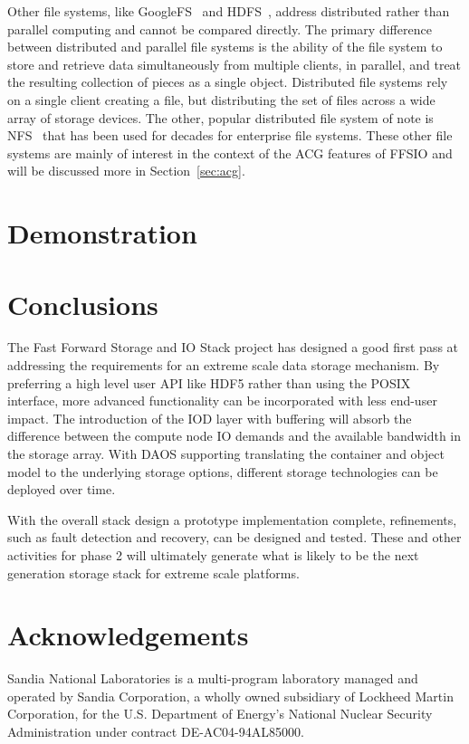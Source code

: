 \documentclass{sig-alt-gov2}
\begin{document}
Other file systems, like GoogleFS~\cite{ghemawat:googlefs} and
HDFS~\cite{Shvachko:2010:hdfs}, address distributed rather than parallel
computing and cannot be compared directly.
The primary difference between
distributed and parallel file systems is the ability of the file system to
store and retrieve data simultaneously from multiple clients, in parallel, and
treat the resulting collection of pieces as a single object.  Distributed file
systems rely on a single client creating a file, but distributing the set of
files across a wide array of storage devices.
The other, popular distributed
file system of note is NFS~\cite{powlowski:1994:nfs3} that has been used for
decades for enterprise file systems.
These other file systems are mainly of
interest in the context of the ACG features of FFSIO and will be discussed more
in Section~\ref{sec:acg}.

\section{Demonstration}
\label{sec:evaluation}


\section{Conclusions}
\label{sec:conclusion}

The Fast Forward Storage and IO Stack project has designed a good first pass at
addressing the requirements for an extreme scale data storage mechanism.  By
preferring a high level user API like HDF5 rather than using the POSIX
interface, more advanced functionality can be incorporated with less end-user
impact. The introduction of the IOD layer with buffering will absorb the
difference between the compute node IO demands and the available bandwidth in
the storage array. With DAOS supporting translating the container and object
model to the underlying storage options, different storage technologies can be
deployed over time.

With the overall stack design a prototype implementation complete, refinements,
such as fault detection and recovery, can be designed and tested.  These and
other activities for phase 2 will ultimately generate what is likely to be the
next generation storage stack for extreme scale platforms.

\section{Acknowledgements}

Sandia National Laboratories is a multi-program laboratory managed and operated
by Sandia Corporation, a wholly owned subsidiary of Lockheed Martin
Corporation, for the U.S. Department of Energy's National Nuclear Security
Administration under contract DE-AC04-94AL85000.




\vfill\eject
\end{document}

